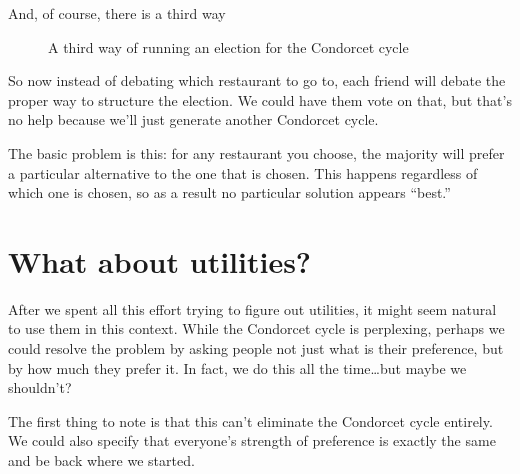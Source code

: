 And, of course, there is a third way

\begin{figure}
\centering
{}
\label{f:cc-third-vote}
\caption{A third way of running an election for the Condorcet cycle}
\end{figure}

So now instead of debating which restaurant to go to, each friend will debate the proper way to structure the election. We could have them vote on that, but that's no help because we'll just generate another Condorcet cycle.

The basic problem is this: for any restaurant you choose, the majority will prefer a particular alternative to the one that is chosen.  This happens regardless of which one is chosen, so as a result no particular solution appears ``best.''

\section{What about utilities?}

After we spent all this effort trying to figure out utilities, it might seem natural to use them in this context.  While the Condorcet cycle is perplexing, perhaps we could resolve the problem by asking people not just what is their preference, but by how much they prefer it.  In fact, we do this all the time\dots but maybe we shouldn't?

The first thing to note is that this can't eliminate the Condorcet cycle entirely. We could also specify that everyone's strength of preference is exactly the same and be back where we started.

